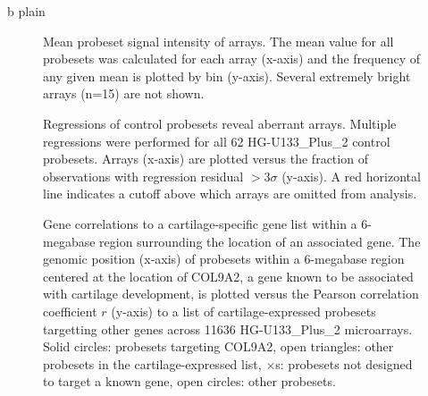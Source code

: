 \documentclass{bioinfo}
\begin{document}
 {b}
 {plain}
\newpage



\begin{figure}[!tpb]
\label{figure:means}
\centerline{}
\caption{Mean probeset signal intensity of arrays.  The mean value for all probesets was
calculated for each array (x-axis) and the frequency of any given mean is
plotted by bin (y-axis).  Several extremely bright arrays (n=15) are not shown.}
\end{figure}


\begin{figure}[!tpb]
\label{figure:rsquare}
\centerline{}
\caption{Regressions of control probesets reveal aberrant arrays.  Multiple regressions
were performed for all 62 HG-U133\_Plus\_2 control probesets.  Arrays (x-axis)
are plotted versus the fraction of observations with regression residual
$>3\sigma$ (y-axis).  A red horizontal line indicates a cutoff above which
arrays are omitted from analysis.}
\end{figure}


\begin{figure}[!tpb]
\label{figure:COL9A2}
\centerline{}
\caption{Gene correlations to a cartilage-specific gene list within a 6-megabase region
surrounding the location of an associated gene.  The genomic position (x-axis)
of probesets within a 6-megabase region centered at the location of COL9A2, a
gene known to be associated with cartilage development, is plotted versus the
Pearson correlation coefficient $r$ (y-axis) to a list of cartilage-expressed
probesets targetting other genes across 11636 HG-U133\_Plus\_2 microarrays.
Solid circles: probesets targeting COL9A2, open triangles: other probesets in
the cartilage-expressed list, $\times$s: probesets not designed to target a
known gene, open circles: other probesets.}
\end{figure}
\end{document}
